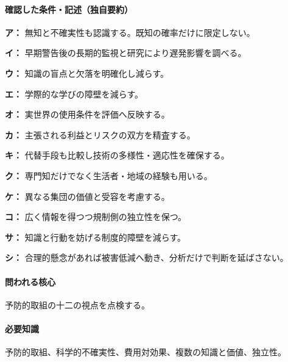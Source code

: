 \paragraph{確認した条件・記述（独自要約）}\mbox{}\par

\noindent\textbf{ア：} 無知と不確実性も認識する。既知の確率だけに限定しない。\par

\noindent\textbf{イ：} 早期警告後の長期的監視と研究により遅発影響を調べる。\par

\noindent\textbf{ウ：} 知識の盲点と欠落を明確化し減らす。\par

\noindent\textbf{エ：} 学際的な学びの障壁を減らす。\par

\noindent\textbf{オ：} 実世界の使用条件を評価へ反映する。\par

\noindent\textbf{カ：} 主張される利益とリスクの双方を精査する。\par

\noindent\textbf{キ：} 代替手段も比較し技術の多様性・適応性を確保する。\par

\noindent\textbf{ク：} 専門知だけでなく生活者・地域の経験も用いる。\par

\noindent\textbf{ケ：} 異なる集団の価値と受容を考慮する。\par

\noindent\textbf{コ：} 広く情報を得つつ規制側の独立性を保つ。\par

\noindent\textbf{サ：} 知識と行動を妨げる制度的障壁を減らす。\par

\noindent\textbf{シ：} 合理的懸念があれば被害低減へ動き、分析だけで判断を延ばさない。\par

\paragraph{問われる核心} 予防的取組の十二の視点を点検する。

\paragraph{必要知識} 予防的取組、科学的不確実性、費用対効果、複数の知識と価値、独立性。

